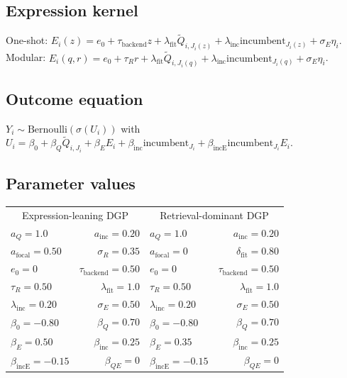 \documentclass[11pt]{article}
\newcommand{\E}{E}
\newcommand{\J}{J}
\newcommand{\Y}{Y}
\newcommand{\Q}{Q}
\begin{document}
\subsection{Expression kernel}

One-shot: $\E_i(z) = e_0 + \tau_{\mathrm{backend}} z + \lambda_{\mathrm{fit}} \tilde{\Q}_{i, \J_i(z)} + \lambda_{\mathrm{inc}} \mathrm{incumbent}_{\J_i(z)} + \sigma_E \eta_i$.
Modular: $\E_i(q, r) = e_0 + \tau_R r + \lambda_{\mathrm{fit}} \tilde{\Q}_{i, \J_i(q)} + \lambda_{\mathrm{inc}} \mathrm{incumbent}_{\J_i(q)} + \sigma_E \eta_i$.

\subsection{Outcome equation}

$\Y_i \sim \mathrm{Bernoulli}(\sigma(U_i))$ with $U_i = \beta_0 + \beta_Q \tilde{\Q}_{i,\J_i} + \beta_E \E_i + \beta_{\mathrm{inc}} \mathrm{incumbent}_{\J_i} + \beta_{\mathrm{incE}} \mathrm{incumbent}_{\J_i} \E_i$.

\subsection{Parameter values}

\begin{tabular}{lr@{\hskip 24pt}lr}
\toprule
\multicolumn{2}{c}{Expression-leaning DGP} & \multicolumn{2}{c}{Retrieval-dominant DGP} \\
$a_Q = 1.0$ & $a_{\mathrm{inc}} = 0.20$ & $a_Q = 1.0$ & $a_{\mathrm{inc}} = 0.20$ \\
$a_{\mathrm{focal}} = 0.50$ & $\sigma_R = 0.35$ & $a_{\mathrm{focal}} = 0$ & $\delta_{\mathrm{fit}} = 0.80$ \\
$e_0 = 0$ & $\tau_{\mathrm{backend}} = 0.50$ & $e_0 = 0$ & $\tau_{\mathrm{backend}} = 0.50$ \\
$\tau_R = 0.50$ & $\lambda_{\mathrm{fit}} = 1.0$ & $\tau_R = 0.50$ & $\lambda_{\mathrm{fit}} = 1.0$ \\
$\lambda_{\mathrm{inc}} = 0.20$ & $\sigma_E = 0.50$ & $\lambda_{\mathrm{inc}} = 0.20$ & $\sigma_E = 0.50$ \\
$\beta_0 = -0.80$ & $\beta_Q = 0.70$ & $\beta_0 = -0.80$ & $\beta_Q = 0.70$ \\
$\beta_E = 0.50$ & $\beta_{\mathrm{inc}} = 0.25$ & $\beta_E = 0.35$ & $\beta_{\mathrm{inc}} = 0.25$ \\
$\beta_{\mathrm{incE}} = -0.15$ & $\beta_{QE} = 0$ & $\beta_{\mathrm{incE}} = -0.15$ & $\beta_{QE} = 0$ \\
\bottomrule
\end{tabular}
\end{document}
